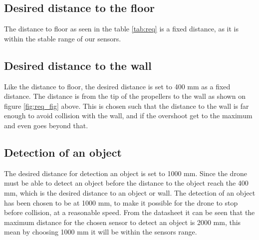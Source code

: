 \subsection*{Desired distance to the floor}
The distance to floor as seen in the table \ref{tab:req} is a fixed distance, as it is within the stable range of our sensors.



\subsection*{Desired distance to the wall}
Like the distance to floor, the desired distance is set to 400 mm as a fixed distance. The distance is from the tip of the propellers to the wall as shown on figure \ref{fig:req_fig} above. This is chosen such that the distance to the wall is far enough to avoid collision with the wall, and if the overshoot get to the maximum and even goes beyond that. 

\subsection*{Detection of an object}
The desired distance for detection an object is set to 1000 mm. Since the drone must be able to detect an object before the distance to the object reach the 400 mm, which is the desired distance to an object or wall. The detection of an object has been chosen to be at 1000 mm, to make it possible for the drone to stop before collision, at a reasonable speed. From the datasheet it can be seen that the maximum distance for the chosen sensor to detect an object is 2000 mm, this mean by choosing 1000 mm it will be within the sensors range.

